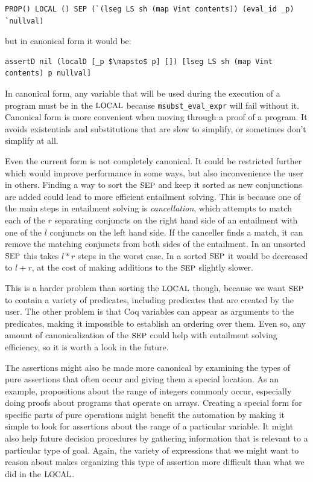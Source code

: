 \documentclass{puthesis}
\begin{document}
\begin{lstlisting}
PROP() LOCAL () SEP (`(lseg LS sh (map Vint contents)) (eval_id _p) `nullval)
\end{lstlisting}

but in canonical form it would be:

\begin{lstlisting}
assertD nil (localD [_p $\mapsto$ p] []) [lseg LS sh (map Vint contents) p nullval]
\end{lstlisting}

In
canonical form, any variable that will be used during the execution of
a program must be in the $\mbox{\small LOCAL}$ because \lstinline|msubst_eval_expr|
will fail without it. Canonical form is more convenient when moving
through a proof of a program. It avoids existentials and substitutions
that are slow to simplify, or sometimes don't simplify at all.

Even the current form is not completely canonical. It could be
restricted further which would improve performance in some ways, but
also inconvenience the user in others. Finding a way to sort the
$\mbox{\small SEP}$ and keep it sorted as new conjunctions are added could lead to
more efficient entailment solving. This is because one of
the main steps in entailment solving is \emph{cancellation}, which
attempts to match
each of the $r$ separating conjuncts on the right hand side of an
entailment with one of the $l$ conjuncts on the left hand side. If the
canceller finds a match, it can remove the matching conjuncts from
both sides of the entailment. In an unsorted $\mbox{\small SEP}$ this takes $l * r$
steps in the worst case. In a sorted $\mbox{\small SEP}$ it would be decreased to
$l + r$, at the cost of making additions to the $\mbox{\small SEP}$ slightly
slower. 

This is a harder problem than sorting the $\mbox{\small LOCAL}$ though, because we
want $\mbox{\small SEP}$ to contain a variety of predicates, including predicates
that are created by the user. The other problem is that Coq variables
can appear as arguments to the predicates, making it impossible to
establish an ordering over them. Even so, any amount of
canonicalization of the $\mbox{\small SEP}$ could help with entailment solving
efficiency, so it is worth a look in the future. 

The assertions might also be made more canonical by examining the
types of pure assertions that often occur and giving them a special
location. As an example, propositions about the range of integers
commonly occur, especially doing proofs about programs that operate on
arrays. Creating a special form for specific parts of pure operations
might benefit the automation by making it simple to look for
assertions about the range of a particular variable. It might also
help future decision procedures by gathering information that is
relevant to a particular type of goal. Again, the variety of
expressions that we might want to reason about makes organizing this
type of assertion more difficult than what we did in the $\mbox{\small LOCAL}$. 
\end{document}
